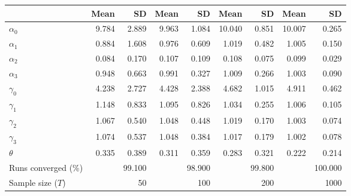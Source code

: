 
\begin{tabular}[t]{lrrrrrrrr}
\toprule
  & Mean & SD & Mean  & SD  & Mean   & SD   & Mean    & SD   \\
\midrule
$\alpha_{0}$ & 9.784 & 2.889 & 9.963 & 1.084 & 10.040 & 0.851 & 10.007 & 0.265\\
$\alpha_{1}$ & 0.884 & 1.608 & 0.976 & 0.609 & 1.019 & 0.482 & 1.005 & 0.150\\
$\alpha_{2}$ & 0.084 & 0.170 & 0.107 & 0.109 & 0.108 & 0.075 & 0.099 & 0.029\\
$\alpha_{3}$ & 0.948 & 0.663 & 0.991 & 0.327 & 1.009 & 0.266 & 1.003 & 0.090\\
$\gamma_{0}$ & 4.238 & 2.727 & 4.428 & 2.388 & 4.682 & 1.015 & 4.911 & 0.462\\
$\gamma_{1}$ & 1.148 & 0.833 & 1.095 & 0.826 & 1.034 & 0.255 & 1.006 & 0.105\\
$\gamma_{2}$ & 1.067 & 0.540 & 1.048 & 0.448 & 1.019 & 0.170 & 1.003 & 0.074\\
$\gamma_{3}$ & 1.074 & 0.537 & 1.048 & 0.384 & 1.017 & 0.179 & 1.002 & 0.078\\
$\theta$ & 0.335 & 0.389 & 0.311 & 0.359 & 0.283 & 0.321 & 0.222 & 0.214\\
Runs converged (\%) &  & 99.100 &  & 98.900 &  & 99.800 &  & 100.000\\
Sample size ($T$) &  & 50 &  & 100 &  & 200 &  & 1000\\
\bottomrule
\end{tabular}
